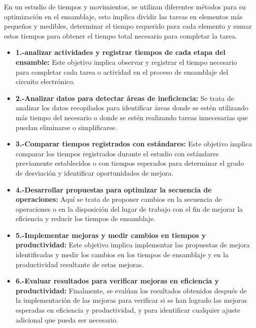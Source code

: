     En un estudio de tiempos y movimientos, se utilizan diferentes métodos para su optimización en el ensamblaje, esto implica dividir las tareas en elementos más pequeños y medibles, determinar el tiempo requerido para cada elemento y sumar estos tiempos para obtener el tiempo total necesario para completar la tarea.
    \begin{itemize}
    
    \item \textbf{1.-analizar actividades y registrar tiempos de cada etapa del ensamble:} Este objetivo implica observar y registrar el tiempo necesario para completar cada tarea o actividad en el proceso de ensamblaje del circuito electrónico.
    
    \item \textbf{2.-Analizar datos para detectar áreas de ineficiencia:} Se trata de analizar los datos recopilados para identificar áreas donde se estén utilizando más tiempo del necesario o donde se estén realizando tareas innecesarias que puedan eliminarse o simplificarse.
    
    \item \textbf{3.-Comparar tiempos registrados con estándares:} Este objetivo implica comparar los tiempos registrados durante el estudio con estándares previamente establecidos o con tiempos esperados para determinar el grado de desviación y identificar oportunidades de mejora.
    
    \item \textbf{4.-Desarrollar propuestas para optimizar la secuencia de operaciones: }Aquí se trata de proponer cambios en la secuencia de operaciones o en la disposición del lugar de trabajo con el fin de mejorar la eficiencia y reducir los tiempos de ensamblaje.
    
    \item \textbf{5.-Implementar mejoras y medir cambios en tiempos y productividad: }Este objetivo implica implementar las propuestas de mejora identificadas y medir los cambios en los tiempos de ensamblaje y en la productividad resultante de estas mejoras.
    
    \item \textbf{6.-Evaluar resultados para verificar mejoras en eficiencia y productividad:} Finalmente, se evalúan los resultados obtenidos después de la implementación de las mejoras para verificar si se han logrado las mejoras esperadas en eficiencia y productividad, y para identificar cualquier ajuste adicional que pueda ser necesario.\cite{Niebel3}
    \end{itemize}
